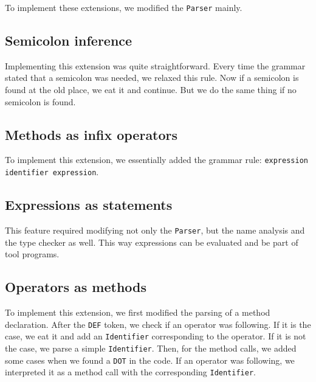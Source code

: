 To implement these extensions, we modified the \lstinline$Parser$ mainly.

\subsection{Semicolon inference}
Implementing this extension was quite straightforward. Every time the grammar stated that a semicolon was needed, we relaxed this rule. Now if a semicolon is found at the old place, we eat it and continue. But we do the same thing if no semicolon is found.

\subsection{Methods as infix operators}
To implement this extension, we essentially added the grammar rule: \lstinline$expression identifier expression$. 

\subsection{Expressions as statements}
This feature required modifying not only the \lstinline$Parser$, but the name analysis and the type checker as well. This way expressions can be evaluated and be part of tool programs.

\subsection{Operators as methods}
To implement this extension, we first modified the parsing of a method declaration. After the \lstinline$DEF$ token, we check if an operator was following. If it is the case, we eat it and add an \lstinline$Identifier$ corresponding to the operator. If it is not the case, we parse a simple \lstinline$Identifier$. Then, for the method calls, we added some cases when we found a \lstinline$DOT$ in the code. If an operator was following, we interpreted it as a method call with the corresponding \lstinline$Identifier$.



